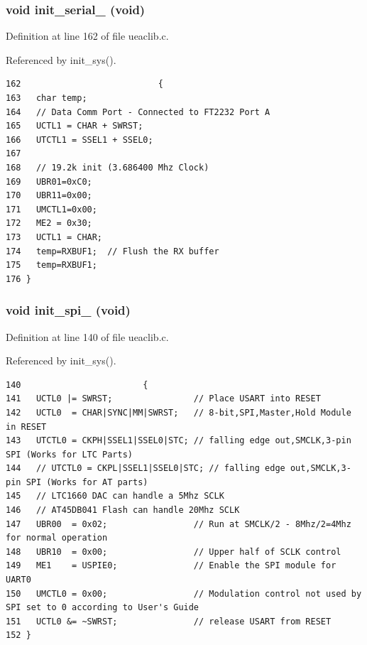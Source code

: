 \subsubsection{\setlength{\rightskip}{0pt plus 5cm}void init\_\-serial\_ (void)}\label{ueaclib_8c_a5}




Definition at line 162 of file ueaclib.c.

Referenced by init\_\-sys().

\footnotesize\begin{verbatim}162                           {
163   char temp;
164   // Data Comm Port - Connected to FT2232 Port A
165   UCTL1 = CHAR + SWRST;
166   UTCTL1 = SSEL1 + SSEL0;
167 
168   // 19.2k init (3.686400 Mhz Clock)
169   UBR01=0xC0; 
170   UBR11=0x00;
171   UMCTL1=0x00; 
172   ME2 = 0x30;
173   UCTL1 = CHAR;
174   temp=RXBUF1;  // Flush the RX buffer 
175   temp=RXBUF1;  
176 }
\end{verbatim}\normalsize 


\subsubsection{\setlength{\rightskip}{0pt plus 5cm}void init\_\-spi\_ (void)}\label{ueaclib_8c_a4}




Definition at line 140 of file ueaclib.c.

Referenced by init\_\-sys().

\footnotesize\begin{verbatim}140                        {
141   UCTL0 |= SWRST;                // Place USART into RESET 
142   UCTL0  = CHAR|SYNC|MM|SWRST;   // 8-bit,SPI,Master,Hold Module in RESET
143   UTCTL0 = CKPH|SSEL1|SSEL0|STC; // falling edge out,SMCLK,3-pin SPI (Works for LTC Parts)
144   // UTCTL0 = CKPL|SSEL1|SSEL0|STC; // falling edge out,SMCLK,3-pin SPI (Works for AT parts)
145   // LTC1660 DAC can handle a 5Mhz SCLK
146   // AT45DB041 Flash can handle 20Mhz SCLK 
147   UBR00  = 0x02;                 // Run at SMCLK/2 - 8Mhz/2=4Mhz for normal operation
148   UBR10  = 0x00;                 // Upper half of SCLK control 
149   ME1    = USPIE0;               // Enable the SPI module for UART0
150   UMCTL0 = 0x00;                 // Modulation control not used by SPI set to 0 according to User's Guide
151   UCTL0 &= ~SWRST;               // release USART from RESET 
152 }
\end{verbatim}\normalsize 


